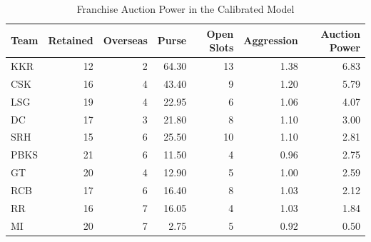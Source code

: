 \begin{table}[H]
\centering
\caption{Franchise Auction Power in the Calibrated Model}
\begin{tabular}{lrrrrrr}
\toprule
Team & Retained & Overseas & Purse & Open Slots & Aggression & Auction Power \\
\midrule
KKR & 12 & 2 & 64.30 & 13 & 1.38 & 6.83 \\
CSK & 16 & 4 & 43.40 & 9 & 1.20 & 5.79 \\
LSG & 19 & 4 & 22.95 & 6 & 1.06 & 4.07 \\
DC & 17 & 3 & 21.80 & 8 & 1.10 & 3.00 \\
SRH & 15 & 6 & 25.50 & 10 & 1.10 & 2.81 \\
PBKS & 21 & 6 & 11.50 & 4 & 0.96 & 2.75 \\
GT & 20 & 4 & 12.90 & 5 & 1.00 & 2.59 \\
RCB & 17 & 6 & 16.40 & 8 & 1.03 & 2.12 \\
RR & 16 & 7 & 16.05 & 4 & 1.03 & 1.84 \\
MI & 20 & 7 & 2.75 & 5 & 0.92 & 0.50 \\
\bottomrule
\end{tabular}
\end{table}
